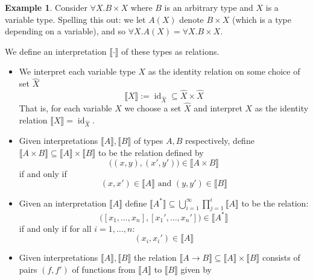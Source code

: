 \documentclass[12pt]{article}
\theoremstyle{plain}
\theoremstyle{definition}
\newtheorem{example}[thm]{Example}
\newcommand{\lto}{\longrightarrow}
\begin{document}
		\begin{example}
			Consider $\forall X. B \times X$ where $B$ is an arbitrary type and $X$ is a variable type. Spelling this out: we let $A(X)$ denote $B \times X$ (which is a type depending on a variable), and so $\forall X. A(X) = \forall X. B \times X$.
			\end{example}
		
		We define an interpretation $\llbracket \cdot \rrbracket$ of these types as relations.
		\begin{itemize}
			\item We interpret each variable type $X$ as the identity relation on some choice of set $\hat{X}$
			\begin{equation}
				\llbracket X \rrbracket := \operatorname{id}_{\hat{X}} \subseteq \hat{X} \times \hat{X}
				\end{equation}
			That is, for each variable $X$ we choose a set $\hat{X}$ and interpret $X$ as the identity relation $\llbracket X \rrbracket = \operatorname{id}_{\hat{X}}$.
			\item Given interpretations $\llbracket A\rrbracket, \llbracket B \rrbracket$ of types $A,B$ respectively, define $\llbracket A \times B \rrbracket \subseteq \llbracket A \rrbracket \times \llbracket B \rrbracket$ to be the relation defined by
				\begin{equation*}
					\big((x,y), (x',y')\big) \in \llbracket A \times B \rrbracket
					\end{equation*}
				if and only if
				\begin{equation*}
				(x,x') \in \llbracket A \rrbracket\text{ and }(y,y') \in \llbracket B \rrbracket
				\end{equation*}
			\item Given an interpretation $\llbracket A \rrbracket$ define $\llbracket A^\ast \rrbracket \subseteq \bigcup_{i = 1}^\infty \prod_{j = 1}^i \llbracket A \rrbracket$ to be the relation:
			\begin{equation*}
				\big([x_1, \ldots, x_n], [x_1', \ldots, x_n']\big) \in \llbracket A^\ast \rrbracket
				\end{equation*}
			if and only if for all $i = 1, \ldots, n$:
				\begin{equation*}
					 (x_i, x_i') \in \llbracket A \rrbracket
				\end{equation*}
			\item Given interpretations $\llbracket A\rrbracket, \llbracket B \rrbracket$ the relation $\llbracket A \lto B \rrbracket \subseteq \llbracket A \rrbracket \times \llbracket B \rrbracket$ consists of pairs $(f,f')$ of functions from $\llbracket A \rrbracket$ to $\llbracket B \rrbracket$ given by

\end{itemize}
\end{document}
